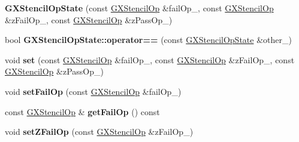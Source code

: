 \begin{DoxyCompactItemize}
\item 
{\bfseries G\+X\+Stencil\+Op\+State} (const \hyperlink{class_magnum_1_1_g_x_stencil_op}{G\+X\+Stencil\+Op} \&fail\+Op\+\_\+, const \hyperlink{class_magnum_1_1_g_x_stencil_op}{G\+X\+Stencil\+Op} \&z\+Fail\+Op\+\_\+, const \hyperlink{class_magnum_1_1_g_x_stencil_op}{G\+X\+Stencil\+Op} \&z\+Pass\+Op\+\_\+)\hypertarget{class_magnum_1_1_g_x_stencil_op_state_a19d33e79364d07972c58c394d620df58}{}\label{class_magnum_1_1_g_x_stencil_op_state_a19d33e79364d07972c58c394d620df58}

\item 
bool {\bfseries G\+X\+Stencil\+Op\+State\+::operator==} (const \hyperlink{class_magnum_1_1_g_x_stencil_op_state}{G\+X\+Stencil\+Op\+State} \&other\+\_\+)\hypertarget{class_magnum_1_1_g_x_stencil_op_state_a54edf63fc13c092d9e995347e5be4f9f}{}\label{class_magnum_1_1_g_x_stencil_op_state_a54edf63fc13c092d9e995347e5be4f9f}

\item 
void {\bfseries set} (const \hyperlink{class_magnum_1_1_g_x_stencil_op}{G\+X\+Stencil\+Op} \&fail\+Op\+\_\+, const \hyperlink{class_magnum_1_1_g_x_stencil_op}{G\+X\+Stencil\+Op} \&z\+Fail\+Op\+\_\+, const \hyperlink{class_magnum_1_1_g_x_stencil_op}{G\+X\+Stencil\+Op} \&z\+Pass\+Op\+\_\+)\hypertarget{class_magnum_1_1_g_x_stencil_op_state_a0d7ff2de2fbe3a6a65b1750602a81cd5}{}\label{class_magnum_1_1_g_x_stencil_op_state_a0d7ff2de2fbe3a6a65b1750602a81cd5}

\item 
void {\bfseries set\+Fail\+Op} (const \hyperlink{class_magnum_1_1_g_x_stencil_op}{G\+X\+Stencil\+Op} \&fail\+Op\+\_\+)\hypertarget{class_magnum_1_1_g_x_stencil_op_state_a3f6061400360cf57ffb0a57d958cbfa3}{}\label{class_magnum_1_1_g_x_stencil_op_state_a3f6061400360cf57ffb0a57d958cbfa3}

\item 
const \hyperlink{class_magnum_1_1_g_x_stencil_op}{G\+X\+Stencil\+Op} \& {\bfseries get\+Fail\+Op} () const \hypertarget{class_magnum_1_1_g_x_stencil_op_state_a2e4a4d6f7a06de41069c853092d31989}{}\label{class_magnum_1_1_g_x_stencil_op_state_a2e4a4d6f7a06de41069c853092d31989}

\item 
void {\bfseries set\+Z\+Fail\+Op} (const \hyperlink{class_magnum_1_1_g_x_stencil_op}{G\+X\+Stencil\+Op} \&z\+Fail\+Op\+\_\+)\hypertarget{class_magnum_1_1_g_x_stencil_op_state_afacbc4c19a6f71a6c391d531f2a43916}{}\label{class_magnum_1_1_g_x_stencil_op_state_afacbc4c19a6f71a6c391d531f2a43916}


\end{DoxyCompactItemize}
